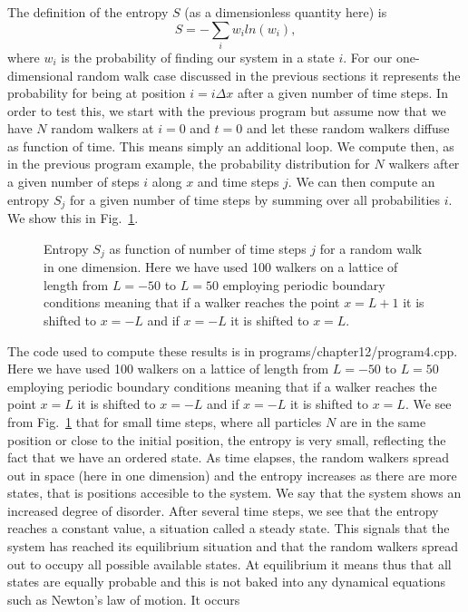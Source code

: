 The definition of the entropy $S$ (as a dimensionless quantity here) is
\[
   S = -\sum_i w_i ln(w_i),
\]
where $w_i$ is the probability of finding our system in a state $i$. For our one-dimensional random walk case discussed
in the previous sections it represents the probability for being at position $i=i\Delta x$ after a given number of time steps.
In order to test this, we start with the previous program but assume now that we have  $N$ random walkers at
$i=0$ and $t=0$ and let these random walkers diffuse as function of time. This means simply an additional loop. 
We compute then, as in the previous program 
example, the probability distribution for $N$ walkers after a given number of steps $i$ along $x$ and 
time steps $j$.
We can then compute an entropy $S_j$ for a given number of time steps by summing over all probabilities $i$.
We show this in Fig.~\ref{fig:entropyrandom}.
\begin{figure} 
\begin{center}

\caption{Entropy $S_j$ as function of number of time steps $j$ for a random walk in one dimension. Here we have used 
100 walkers on a lattice of length from $L=-50$ to $L=50$ employing periodic boundary conditions meaning
that if a walker reaches the point $x=L+1$ it is shifted to $x=-L$ and if $x=-L$ it is shifted to $x=L$. 
\label{fig:entropyrandom}}
\end{center}
\end{figure}
The code used to compute these results is in programs/chapter12/program4.cpp.
Here we have used 
100 walkers on a lattice of length from $L=-50$ to $L=50$ employing periodic boundary conditions meaning
that if a walker reaches the point $x=L$ it is shifted to $x=-L$ and if $x=-L$ it is shifted to $x=L$.
We see from Fig.~\ref{fig:entropyrandom} that for small time steps, where all particles $N$ 
are in the same position or close to the initial position,
the entropy is very small, reflecting the fact that we have an ordered state. As time elapses, the random walkers spread
out in space (here in one dimension) and the entropy increases as there are more states, that is positions accesible 
to the system. We say that the system shows an increased degree of disorder. 
After several time steps, we see that the entropy  reaches a constant value, a situation called a steady state.
This signals that the system has reached its equilibrium situation and that the random walkers spread out to
occupy all possible available states. At equilibrium it means thus that all states
are equally probable and this is not baked into any dynamical equations such as Newton's law of motion. It occurs
